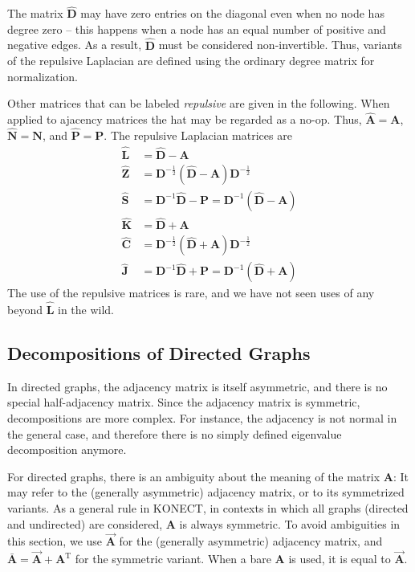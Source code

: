 \documentclass{article}
\begin{document}
The matrix $\mathbf{\hat D}$ may have zero entries on the diagonal even
when no node has degree zero -- this happens when a node has an equal
number of positive and negative edges.  As a result, $\mathbf{\hat D}$
must be considered non-invertible.  Thus, variants of the repulsive
Laplacian are defined using the ordinary degree matrix for
normalization.

Other matrices that can be labeled \emph{repulsive} are given in the
following. 
When applied to ajacency matrices the hat may be regarded as a no-op.
Thus, $\mathbf{\hat A}=\mathbf A$, $\mathbf{\hat N}=\mathbf N$, and $\mathbf{\hat P}=\mathbf P$.
The repulsive Laplacian matrices are 
\begin{align}
  \mathbf{\hat L} &= \mathbf{\hat D} - \mathbf A \\
  \mathbf{\hat Z} &= \mathbf D^{-\frac 12} (\mathbf{\hat D} - \mathbf A) \mathbf D^{-\frac 12} \\
  \mathbf{\hat S} &= \mathbf D^{-1} \mathbf{\hat D} - \mathbf P = \mathbf D^{-1}(\mathbf{\hat D} - \mathbf A) \\
  \mathbf{\hat K} &= \mathbf{\hat D} + \mathbf A \\
  \mathbf{\hat C} &= \mathbf D^{-\frac 12} (\mathbf{\hat D} + \mathbf A) \mathbf D^{-\frac 12} \\
  \mathbf{\hat J} &= \mathbf D^{-1} \mathbf{\hat D} + \mathbf P = \mathbf D^{-1}(\mathbf{\hat D} + \mathbf A) 
\end{align}
The use of the repulsive matrices is rare, and we have not seen uses of
any beyond $\mathbf{\hat L}$ in the wild.  

\subsection{Decompositions of Directed Graphs}
In directed graphs, the adjacency matrix is itself
asymmetric, and there is no special half-adjacency matrix.  Since the
adjacency matrix is symmetric, decompositions are more complex.  For
instance, the adjacency is not normal in the general case, and therefore
there is no simply defined eigenvalue decomposition anymore. 

For directed graphs, there is an ambiguity about the meaning of the
matrix $\mathbf A$:  It may refer to the (generally asymmetric)
adjacency matrix, or to its symmetrized variants.  As a general rule in
KONECT, in contexts in which all graphs (directed and undirected) are
considered, $\mathbf A$ is always symmetric.  To avoid ambiguities in
this section, we use $\vec{\mathbf A}$ for the (generally asymmetric)
adjacency matrix, and $\mathbf{\bar A}=\vec{\mathbf A}+\mathbf
A^{\mathrm T}$ for the symmetric variant.  When a bare $\mathbf A$ is
used, it is equal to $\vec{\mathbf A}$. 
\end{document}
